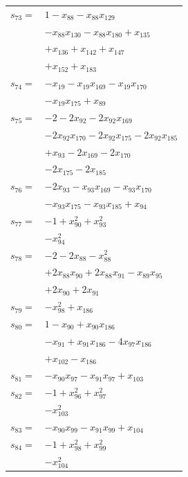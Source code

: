 \begin{longtable}{@{}r@{\;}l@{}}
\(s_{73}=\) & \(\displaystyle 1 -x_{88} -x_{88}x_{129}\) \\
 & \(\displaystyle -x_{88}x_{130} -x_{88}x_{180} +x_{135}\) \\
 & \(\displaystyle +x_{136} +x_{142} +x_{147}\) \\
 & \(\displaystyle +x_{152} +x_{183}\) \\[3pt]
\(s_{74}=\) & \(\displaystyle -x_{19} -x_{19}x_{169} -x_{19}x_{170}\) \\
 & \(\displaystyle -x_{19}x_{175} +x_{89}\) \\[3pt]
\(s_{75}=\) & \(\displaystyle -2 -2x_{92} -2x_{92}x_{169}\) \\
 & \(\displaystyle -2x_{92}x_{170} -2x_{92}x_{175} -2x_{92}x_{185}\) \\
 & \(\displaystyle +x_{93} -2x_{169} -2x_{170}\) \\
 & \(\displaystyle -2x_{175} -2x_{185}\) \\[3pt]
\(s_{76}=\) & \(\displaystyle -2x_{93} -x_{93}x_{169} -x_{93}x_{170}\) \\
 & \(\displaystyle -x_{93}x_{175} -x_{93}x_{185} +x_{94}\) \\[3pt]
\(s_{77}=\) & \(\displaystyle -1 +x_{90}^{2} +x_{93}^{2}\) \\
 & \(\displaystyle -x_{94}^{2}\) \\[3pt]
\(s_{78}=\) & \(\displaystyle -2 -2x_{88} -x_{88}^{2}\) \\
 & \(\displaystyle +2x_{88}x_{90} +2x_{88}x_{91} -x_{89}x_{95}\) \\
 & \(\displaystyle +2x_{90} +2x_{91}\) \\[3pt]
\(s_{79}=\) & \(\displaystyle -x_{98}^{2} +x_{186}\) \\[3pt]
\(s_{80}=\) & \(\displaystyle 1 -x_{90} +x_{90}x_{186}\) \\
 & \(\displaystyle -x_{91} +x_{91}x_{186} -4x_{97}x_{186}\) \\
 & \(\displaystyle +x_{102} -x_{186}\) \\[3pt]
\(s_{81}=\) & \(\displaystyle -x_{90}x_{97} -x_{91}x_{97} +x_{103}\) \\[3pt]
\(s_{82}=\) & \(\displaystyle -1 +x_{96}^{2} +x_{97}^{2}\) \\
 & \(\displaystyle -x_{103}^{2}\) \\[3pt]
\(s_{83}=\) & \(\displaystyle -x_{90}x_{99} -x_{91}x_{99} +x_{104}\) \\[3pt]
\(s_{84}=\) & \(\displaystyle -1 +x_{98}^{2} +x_{99}^{2}\) \\
 & \(\displaystyle -x_{104}^{2}\) \\[3pt]

\end{longtable}
